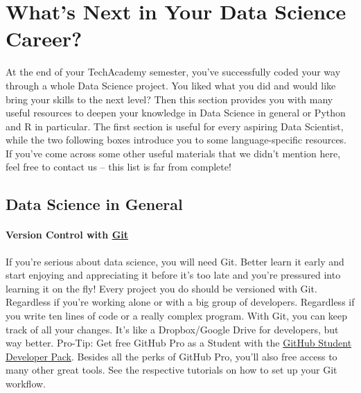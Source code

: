 \documentclass[
  11pt,
]{article}
\begin{document}
\newpage

\hypertarget{whats-next-in-your-data-science-career}{%
\section{What's Next in Your Data Science Career?}\label{whats-next-in-your-data-science-career}}

At the end of your TechAcademy semester, you've successfully coded your way through a whole Data Science project. You liked what you did and would like bring your skills to the next level? Then this section provides you with many useful resources to deepen your knowledge in Data Science in general or Python and R in particular. The first section is useful for every aspiring Data Scientist, while the two following boxes introduce you to some language-specific resources. If you've come across some other useful materials that we didn't mention here, feel free to contact us -- this list is far from complete!

\hypertarget{data-science-in-general}{%
\subsection{Data Science in General}\label{data-science-in-general}}

\hypertarget{version-control-with-git}{%
\paragraph*{\texorpdfstring{Version Control with \href{https://github.com/}{Git}}{Version Control with Git}}\label{version-control-with-git}}

If you're serious about data science, you will need Git. Better learn it early and start enjoying and appreciating it before it's too late and you're pressured into learning it on the fly! Every project you do should be versioned with Git. Regardless if you're working alone or with a big group of developers. Regardless if you write ten lines of code or a really complex program. With Git, you can keep track of all your changes. It's like a Dropbox/Google Drive for developers, but way better. Pro-Tip: Get free GitHub Pro as a Student with the \href{https://education.github.com/pack}{GitHub Student Developer Pack}. Besides all the perks of GitHub Pro, you'll also free access to many other great tools. See the respective tutorials on how to set up your Git workflow.
\end{document}
